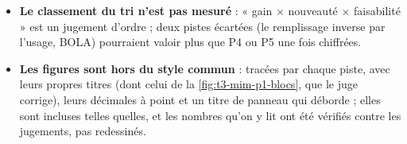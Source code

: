 \begin{faux}
\begin{itemize}
\item \textbf{Le classement du tri n'est pas mesuré} : « gain $\times$ nouveauté $\times$ faisabilité » est un jugement d'ordre ; deux pistes écartées (le remplissage inverse par l'usage, BOLA) pourraient valoir plus que P4 ou P5 une fois chiffrées.
\item \textbf{Les figures sont hors du style commun} : tracées par chaque piste, avec leurs propres titres (dont celui de la \cref{fig:t3-mim-p1-blocs}, que le juge corrige), leurs décimales à point et un titre de panneau qui déborde ; elles sont incluses telles quelles, et les nombres qu'on y lit ont été vérifiés contre les jugements, pas redessinés.
\end{itemize}
\end{faux}
